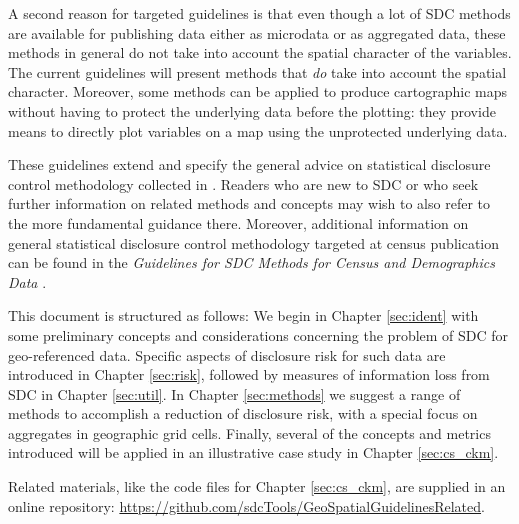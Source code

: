 A second reason for targeted guidelines is that even though a lot of SDC methods are available for publishing data either as microdata or as aggregated data, these methods in general do not take into account the spatial character of the variables. The current guidelines will present methods that \textit{do} take into account the spatial character. Moreover, some methods can be applied to produce cartographic maps without having to protect the underlying data before the plotting: they provide means to directly plot variables on a map using the unprotected underlying data.\bigskip

These guidelines extend and specify the general advice on statistical disclosure control methodology collected in \citet{HundepoolEtAl2024}. Readers who are new to SDC or who seek further information on related methods and concepts may wish to also refer to the more fundamental guidance there.
Moreover, additional information on general statistical disclosure control methodology targeted at census publication can be found in the \emph{Guidelines for SDC Methods for Census and Demographics Data} \citep{Guidelines3_CensusDemog}. \bigskip

This document is structured as follows: We begin in Chapter \ref{sec:ident} with some preliminary concepts and considerations concerning the problem of SDC for geo-referenced data. Specific aspects of disclosure risk for such data are introduced in Chapter \ref{sec:risk}, followed by measures of information loss from SDC in Chapter \ref{sec:util}. In Chapter \ref{sec:methods} we suggest a range of methods to accomplish a reduction of disclosure risk, with a special focus on aggregates in geographic grid cells. Finally, several of the concepts and metrics introduced will be applied in an illustrative case study in Chapter \ref{sec:cs_ckm}.\bigskip

Related materials, like the code files for Chapter \ref{sec:cs_ckm}, are supplied in an online repository:
\url{https://github.com/sdcTools/GeoSpatialGuidelinesRelated}.
